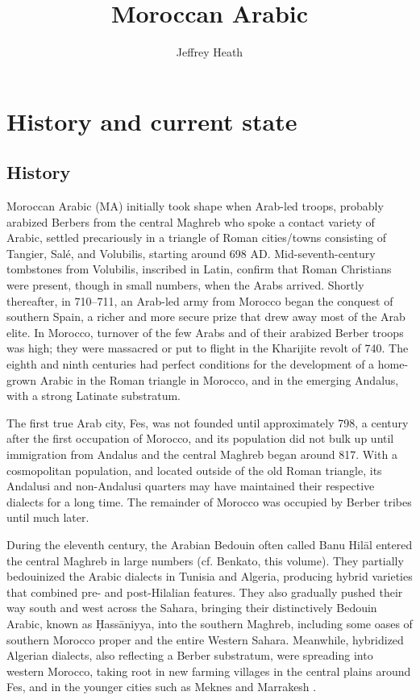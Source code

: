 \documentclass[output=paper]{langsci/langscibook}
\title{Moroccan Arabic}
\author{Jeffrey Heath\affiliation{University of Michigan}}
\begin{document}
\section{History and current state}

\subsection{History}

Moroccan Arabic (MA) initially took shape when Arab-led troops, probably arabized Berbers from the central Maghreb who spoke a contact variety of Arabic, settled precariously in a triangle of Roman cities/towns consisting of Tangier, Salé, and Volubilis, starting around 698 AD. Mid-seventh-century tombstones from Volubilis, inscribed in Latin, confirm that Roman Christians were present, though in small numbers, when the Arabs arrived. Shortly thereafter, in 710–711, an Arab-led army from Morocco began the conquest of southern Spain, a richer and more secure prize that drew away most of the Arab elite. In Morocco, turnover of the few Arabs and of their arabized Berber troops was high; they were massacred or put to flight in the Kharijite revolt of 740. The eighth and ninth centuries had perfect conditions for the development of a home-grown Arabic in the Roman triangle in Morocco, and in the emerging Andalus, with a strong Latinate substratum.  

The first true Arab city, Fes, was not founded until approximately 798, a century after the first occupation of Morocco, and its population did not bulk up until immigration from Andalus and the central Maghreb began around 817. With a cosmopolitan population, and located outside of the old Roman triangle, its Andalusi and non-Andalusi quarters may have maintained their respective dialects for a long time. The remainder of Morocco was occupied by Berber tribes until much later.

During the eleventh century, the Arabian Bedouin often called Banu Hilāl entered the central Maghreb in large numbers (cf. Benkato, this volume). They partially bedouinized the Arabic dialects in Tunisia and Algeria, producing hybrid varieties that combined pre- and post-Hilalian features. They also gradually pushed their way south and west across the Sahara, bringing their distinctively Bedouin Arabic, known as Ḥassāniyya, into the southern Maghreb, including some oases of southern Morocco proper and the entire Western Sahara. Meanwhile, hybridized Algerian dialects, also reflecting a Berber substratum, were spreading into western Morocco, taking root in new farming villages in the central plains around Fes, and in the younger cities such as Meknes and Marrakesh \citep{Heath2002}.
\end{document}
